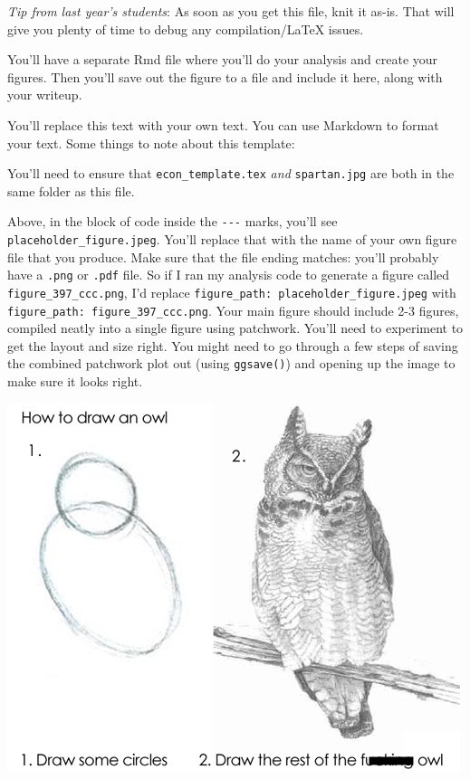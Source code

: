 \documentclass{article}
\begin{document}
    \begin{multicols}{3}
    \makeatletter
    \makeatother 
    \vspace{0.2in}
    
    
    \vspace{0.15in}
    
    \emph{Tip from last year's students}: As soon as you get this file,
knit it as-is. That will give you plenty of time to debug any
compilation/LaTeX issues.

You'll have a separate Rmd file where you'll do your analysis and create
your figures. Then you'll save out the figure to a file and include it
here, along with your writeup.

You'll replace this text with your own text. You can use Markdown to
format your text. Some things to note about this template:

You'll need to ensure that \texttt{econ\_template.tex} \emph{and}
\texttt{spartan.jpg} are both in the same folder as this file.

Above, in the block of code inside the \texttt{-\/-\/-} marks, you'll
see \texttt{placeholder\_figure.jpeg}. You'll replace that with the name
of your own figure file that you produce. Make sure that the file ending
matches: you'll probably have a \texttt{.png} or \texttt{.pdf} file. So
if I ran my analysis code to generate a figure called
\texttt{figure\_397\_ccc.png}, I'd replace
\texttt{figure\_path:\ placeholder\_figure.jpeg} with
\texttt{figure\_path:\ figure\_397\_ccc.png}. Your main figure should
include 2-3 figures, compiled neatly into a single figure using
patchwork. You'll need to experiment to get the layout and size right.
You might need to go through a few steps of saving the combined
patchwork plot out (using \texttt{ggsave()}) and opening up the image to
make sure it looks right.

\includegraphics[width=0.95\columnwidth]{owl.jpg}


\end{multicols}
\end{document}
